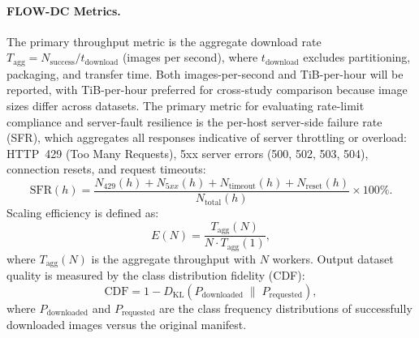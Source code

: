 \documentclass[11pt, letterpaper]{article}
\begin{document}
\paragraph{FLOW-DC Metrics.}
The primary throughput metric is the aggregate download rate
$T_{\mathrm{agg}} = N_{\mathrm{success}} / t_{\mathrm{download}}$ (images per
second), where $t_{\mathrm{download}}$ excludes partitioning, packaging, and
transfer time. Both images-per-second and TiB-per-hour will be reported, with
TiB-per-hour preferred for cross-study comparison because image sizes differ
across datasets. The primary metric for evaluating rate-limit compliance and
server-fault resilience is the per-host server-side failure rate (SFR),
which aggregates all responses indicative of server throttling or overload:
HTTP~429 (Too Many Requests), 5xx server errors (500, 502, 503, 504),
connection resets, and request timeouts:
%
\begin{equation}
\label{eq:sfr}
\mathrm{SFR}(h) = \frac{N_{429}(h) + N_{5xx}(h) + N_{\mathrm{timeout}}(h)
  + N_{\mathrm{reset}}(h)}{N_{\mathrm{total}}(h)} \times 100\%.
\end{equation}
%
Scaling efficiency is
defined as:
%
\begin{equation}
\label{eq:scaling}
E(N) = \frac{T_{\mathrm{agg}}(N)}{N \cdot T_{\mathrm{agg}}(1)},
\end{equation}
%
where $T_{\mathrm{agg}}(N)$ is the aggregate throughput with $N$ workers.
Output dataset quality is measured by the class distribution fidelity (CDF):
%
\begin{equation}
\label{eq:cdf}
\mathrm{CDF} = 1 - D_{\mathrm{KL}}\!\left(P_{\mathrm{downloaded}}
  \;\|\; P_{\mathrm{requested}}\right),
\end{equation}
%
where $P_{\mathrm{downloaded}}$ and $P_{\mathrm{requested}}$ are the class
frequency distributions of successfully downloaded images versus the original
manifest.
\end{document}

